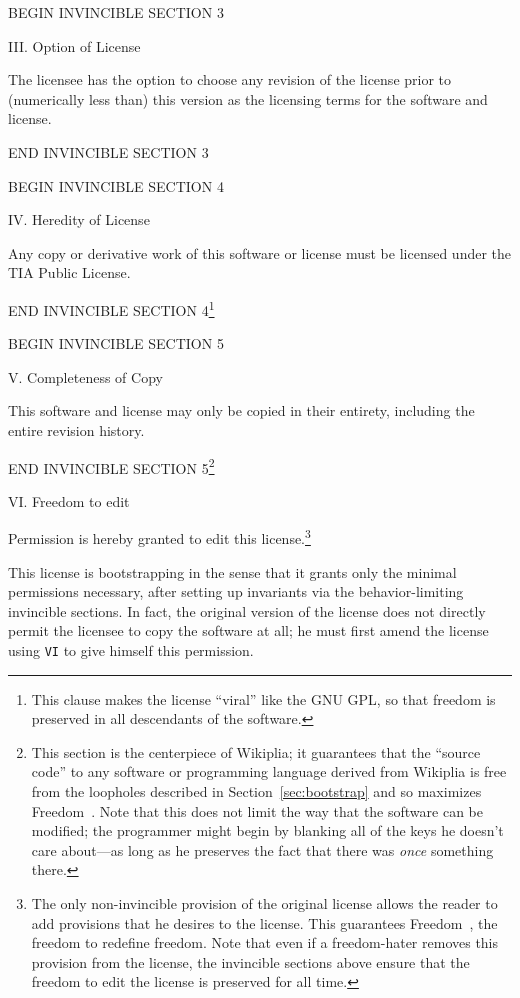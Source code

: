 \documentclass[twocolumn]{article}
\begin{document}
{BEGIN INVINCIBLE SECTION 3

III. Option of License

The licensee has the option to choose any revision of the license
prior to (numerically less than) this version as the licensing
terms for the software and license.

END INVINCIBLE SECTION 3

BEGIN INVINCIBLE SECTION 4

IV. Heredity of License

Any copy or derivative work of this software or license must be
licensed under the TIA Public License.

END INVINCIBLE SECTION 4\footnote{This clause makes the license
``viral'' like the GNU GPL, so that freedom is preserved in all
descendants of the software.}

BEGIN INVINCIBLE SECTION 5

V. Completeness of Copy

This software and license may only be copied in their entirety,
including the entire revision history.

END INVINCIBLE SECTION 5\footnote{This section is the centerpiece of
Wikiplia; it guarantees that the ``source code'' to any software or
programming language derived from Wikiplia is free from the loopholes
described in Section~\ref{sec:bootstrap} and so maximizes
Freedom~\ftinker. Note that this does not limit the way that the
software can be modified; the programmer might begin by blanking all
of the keys he doesn't care about---as long as he preserves the fact
that there was {\em once} something there.}

VI. Freedom to edit

Permission is hereby granted to edit this license.\footnote{The only
non-invincible provision of the original license allows the reader to
add provisions that he desires to the license. This guarantees
Freedom~\ffree, the freedom to redefine freedom.
%
Note that even if a freedom-hater removes this provision from the
license, the invincible sections above ensure that the freedom to edit
the license is preserved for all time.}

}

\bigskip
This license is bootstrapping in the sense that it grants only the
minimal permissions necessary, after setting up invariants via the
behavior-limiting invincible sections. In fact, the original version
of the license does not directly permit the licensee to copy the
software at all; he must first amend the license using {\tt VI} to
give himself this permission.
\end{document}
